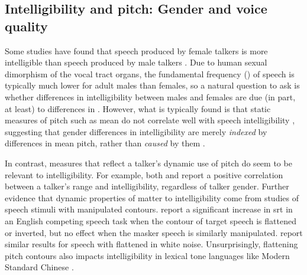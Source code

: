 \subsection[Intelligibility and pitch]{Intelligibility and pitch: Gender and voice quality\label{sec:IntelPitch}}
Some studies have found that speech produced by female talkers is more intelligible than speech produced by male talkers \citep{BradlowEtAl1996, HazanMarkham2004}.  Due to human sexual dimorphism of the vocal tract organs, the fundamental frequency (\fo) of speech is typically much lower for adult males than females, so a natural question to ask is whether differences in intelligibility between males and females are due (in part, at least) to differences in \fo.  However, what is typically found is that static measures of pitch such as mean \fo{} do not correlate well with speech intelligibility \citep[\eg,][]{PichenyEtAl1986, BradlowEtAl1996, HazanMarkham2004, LuCooke2009}, suggesting that gender differences in intelligibility are merely {\em indexed} by differences in mean pitch, rather than {\em caused} by them \citep[cf. discussion in][]{BradlowEtAl1996}.  

In contrast, measures that reflect a talker’s dynamic use of pitch do seem to be relevant to intelligibility.  For example, both \citet{BradlowEtAl1996} and \citet{McCloyEtAl2013} report a positive correlation between a talker’s \fo{} range and intelligibility, regardless of talker gender.  %
Further evidence that dynamic properties of \fo{} matter to intelligibility come from studies of speech stimuli with manipulated \fo{} contours.  \citet{BinnsCulling2007} report a significant increase in \ac{srt} in an English competing speech task when the \fo{} contour of target speech is flattened or inverted, but no effect when the masker speech is similarly manipulated.  \citet{WatsonSchlauch2008} report similar results for speech with flattened \fo{} in white noise.  Unsurprisingly, flattening pitch contours also impacts intelligibility in lexical tone languages like Modern Standard Chinese \citep{PatelEtAl2010}.

